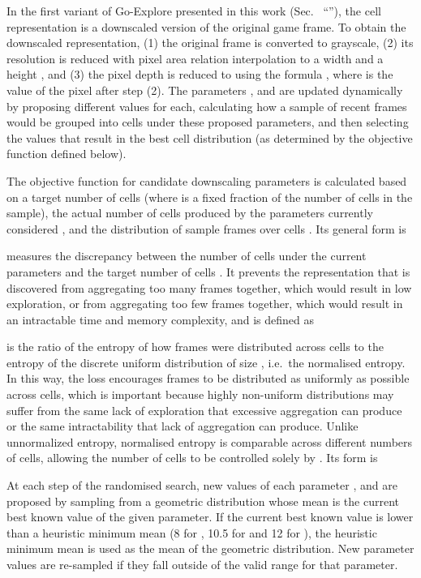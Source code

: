 \documentclass{nature}
\begin{document}
\begin{methods}
In the first variant of Go-Explore presented in this work (Sec.~ ``''), the cell representation is a downscaled version of the original game frame. To obtain the downscaled representation, (1) the original frame is converted to grayscale, (2) its resolution is reduced with pixel area relation interpolation to a width  and a height , and (3) the pixel depth is reduced to  using the formula , where  is the value of the pixel after step (2).
The parameters ,  and  are updated dynamically by proposing different values for each, calculating how a sample of recent frames would be grouped into cells under these proposed parameters, and then selecting the values that result in the best cell distribution (as determined by the objective function defined below).

The objective function for candidate downscaling parameters is calculated based on a target number of cells  (where  is a fixed fraction of the number of cells in the sample), the actual number of cells produced by the parameters currently considered , and the distribution of sample frames over cells . Its general form is

 measures the discrepancy between the number of cells under the current parameters  and the target number of cells .
It prevents the representation that is discovered from aggregating too many frames together, which would result in low exploration, or from aggregating too few frames together, which would result in an intractable time and memory complexity, and is defined as

 is the ratio of the entropy of how frames were distributed across cells to the entropy of the discrete uniform distribution of size , i.e.~the normalised entropy. In this way, the loss encourages frames to be distributed as uniformly as possible across cells, which is important because highly non-uniform distributions may suffer from the same lack of exploration that excessive aggregation can produce or the same intractability that lack of aggregation can produce. Unlike unnormalized entropy, normalised entropy is comparable across different numbers of cells, allowing the number of cells to be controlled solely by . Its form is

At each step of the randomised search, new values of each parameter ,  and  are proposed by sampling from a geometric distribution whose mean is the current best known value of the given parameter. If the current best known value is lower than a heuristic minimum mean (8 for , 10.5 for  and 12 for ), the heuristic minimum mean is used as the mean of the geometric distribution. New parameter values are re-sampled if they fall outside of the valid range for that parameter.


\end{methods}
\end{document}
